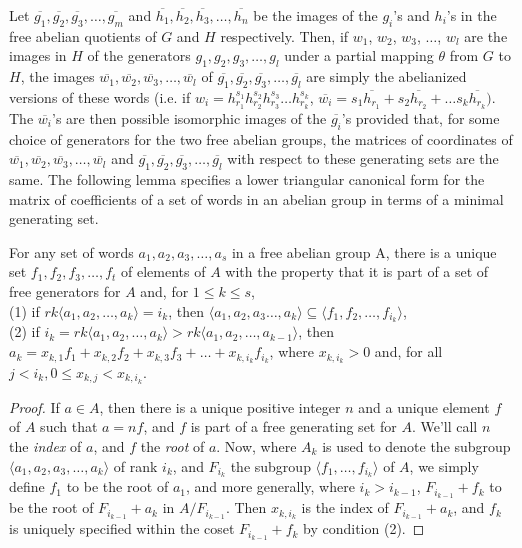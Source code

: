 Let $\overline{g_1}, \overline{g_2},
\overline{g_3},\ldots, \overline{g_m}$ and 
$\overline{h_1}, \overline{h_2}, \overline{h_3},\ldots, \overline{h_n}$ be the
 images of the $g_i$'s and $h_i$'s in
the free abelian quotients of $G$ and $H$ respectively. 
Then, if $w_1$, $w_2$, $w_3$, $\ldots$, $w_l$ are
the images in $H$ of the generators $g_1, g_2, g_3,\ldots ,g_l$
under a partial mapping $\theta$ from $G$ to $H$, the images 
 $\overline{w_1}, \overline{w_2}, \overline{w_3}, \ldots,  \overline{w_l}$ of 
$\overline{g_1}, \overline{g_2}, \overline{g_3},\ldots, \overline{g_l}$
 are simply the abelianized versions of these words (i.e. if
$w_i = h_{r_1}^{s_1}h_{r_2}^{s_2}h_{r_3}^{s_3}\ldots h_{r_k}^{s_k}$,
 $\overline{w_i} = s_1\overline{h_{r_1}} + s_2\overline{h_{r_2}}
 + \ldots  s_k\overline{h_{r_k}})$. 
The $\overline{w_i}$'s are then possible
isomorphic images of the $\overline{g_i}$'s provided that,
for some choice of generators for the two free abelian groups, the matrices of 
coordinates of $\overline{w_1}, \overline{w_2},\overline{w_3},
\ldots, \overline{w_l}$ 
and $\overline{g_1},\overline{g_2},\overline{g_3},\ldots, \overline{g_l}$ 
with respect to these generating sets are the same. 
The following lemma
specifies a lower triangular canonical form for the
matrix of coefficients of a set of words in an abelian group in terms of a
minimal generating set. 
\begin{lemma}
For any set of words $a_1, a_2, a_3,\ldots, a_s$ in a free abelian group A, 
there is a unique set $f_1, f_2, f_3, \ldots, f_t$ of elements 
of $A$ with the property that it is part of a set of free generators for
$A$ and, for $1 \leq k \leq s$,\\
(1) if $rk \langle a_1,a_2,\ldots, a_k \rangle = i_k$, 
then $\langle a_1,a_2,a_3\ldots, a_k \rangle
\subseteq \langle f_1,f_2,\ldots, f_{i_k} \rangle$,\\
(2) if $i_k =  rk \langle a_1,a_2,\ldots, a_k \rangle >
 rk \langle a_1,a_2,\ldots, a_{k-1} \rangle$, then
$a_k = x_{k,1}f_1 + x_{k,2}f_2 + x_{k,3}f_3 + \ldots + x_{k,i_k}f_{i_k}$,
 where  $x_{k,i_k}>0$ and,
for all $j < i_k, 0 \leq x_{k,j} < x_{k,i_k}$.\\
\end{lemma}
\begin{proof}
If $a \in A$, then there is a unique positive integer $n$ and a unique element
$f$ of $A$ such that $a = nf$, and $f$ is part of a free generating set for $A$.
We'll
call $n$ the {\em index} of $a$, and $f$ the {\em root} of $a$.
Now, where $A_k$ is used to denote the subgroup
$\langle a_1,a_2,a_3,\ldots, a_k \rangle$ of rank $i_k$, and $F_{i_k}$ 
the subgroup $\langle f_1,\ldots, f_{i_k} \rangle$ of $A$, we 
simply define $f_1$ to be the root
of $a_1$, and  more generally, where $i_k>i_{k-1}$, $F_{i_{k-1}} + f_k$ to be 
the root of $F_{i_{k-1}} + a_k$ in $A/F_{i_{k-1}}$. 
Then $x_{k,i_k}$ is the index of $F_{i_{k-1}} + a_k$, and $f_k$
is uniquely specified within the coset
$F_{i_{k-1}} + f_k$ by condition (2).
\end{proof}

